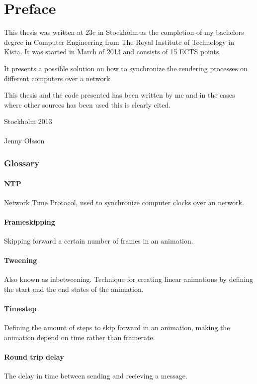 \chapter{Preface}

This thesis was written at 23c in Stockholm as the completion of my bachelors degree in Computer Engineering from The Royal Institute of Technology in Kista. It was started in March of 2013 and consists of 15 ECTS points. 

It presents a possible solution on how to synchronize the rendering processes on different computers over a network. 

This thesis and the code presented has been written by me and in the cases where other sources has been used this is clearly cited. 


\vspace{20mm}
\mbox{}\hfill
\begin{minipage}[t]{80mm}
  Stockholm 2013\\
  \vspace{1cm}\\
  Jenny Olsson
\end{minipage}

\subsection*{Glossary}

\subsubsection*{NTP}
Network Time Protocol, used to synchronize computer clocks over an network. 

\subsubsection*{Frameskipping}
Skipping forward a certain number of frames in an animation.

\subsubsection*{Tweening}
Also known as inbetweening. Technique for creating linear animations by defining the start and the end states of the animation. 

\subsubsection*{Timestep}
Defining the amount of steps to skip forward in an animation, making the animation depend on time rather than framerate.

\subsubsection*{Round trip delay}
The delay in time between sending and recieving a message. 
